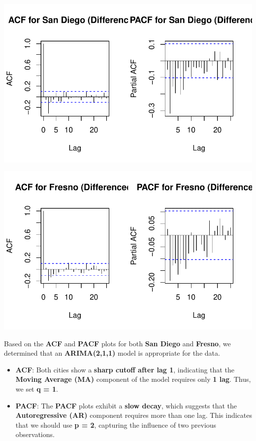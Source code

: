 \documentclass[
  11pt,
]{article}
\begin{document}
\includegraphics{project_files/figure-pdf/unnamed-chunk-86-1.pdf}

\includegraphics{project_files/figure-pdf/unnamed-chunk-87-1.pdf}

Based on the \textbf{ACF} and \textbf{PACF} plots for both \textbf{San
Diego} and \textbf{Fresno}, we determined that an \textbf{ARIMA(2,1,1)}
model is appropriate for the data.

\begin{itemize}
\item
  \textbf{ACF}: Both cities show a \textbf{sharp cutoff after lag 1},
  indicating that the \textbf{Moving Average (MA)} component of the
  model requires only \textbf{1 lag}. Thus, we set \textbf{q = 1}.
\item
  \textbf{PACF}: The \textbf{PACF} plots exhibit a \textbf{slow decay},
  which suggests that the \textbf{Autoregressive (AR)} component
  requires more than one lag. This indicates that we should use
  \textbf{p = 2}, capturing the influence of two previous observations.
\end{itemize}
\end{document}
